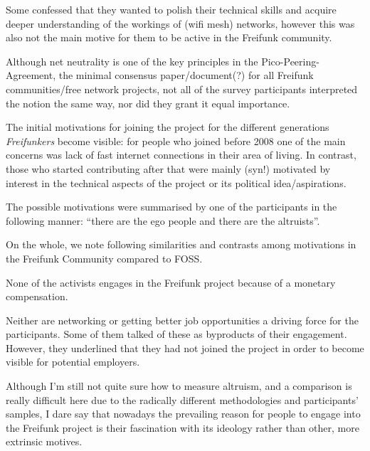 Some confessed that they wanted to polish their technical skills and acquire deeper understanding of the workings of (wifi mesh) networks, however this was also not the main motive for them to be active in the Freifunk community.

Although net neutrality is one of the key principles in the Pico-Peering-Agreement, the minimal consensus paper/document(?) for all Freifunk communities/free network projects, not all of the survey participants interpreted the notion the same way, nor did they grant it equal importance.

The initial motivations for joining the project for the different generations \textit{Freifunkers} become visible:
for people who joined before 2008 one of the main concerns was lack of fast internet connections in their area of living.
In contrast, those who started contributing after that were mainly (syn!) motivated by interest in the technical aspects of the project or its political idea/aspirations.

The possible motivations were summarised by one of the participants in the following manner: ``there are the ego people and there are the altruists''.

On the whole, we note following similarities and contrasts among motivations in the Freifunk Community compared to FOSS.

None of the activists engages in the Freifunk project because of a monetary compensation.

Neither are networking or getting better job opportunities a driving force for the participants.
Some of them talked of these as byproducts of their engagement.
However, they underlined that they had not joined the project in order to become visible for potential employers.



Although I'm still not quite sure how to measure altruism, and a comparison is really difficult here due to the radically different methodologies and participants' samples, I dare say that nowadays the prevailing reason for people to engage into the Freifunk project is their fascination with its ideology rather than other, more extrinsic motives.

